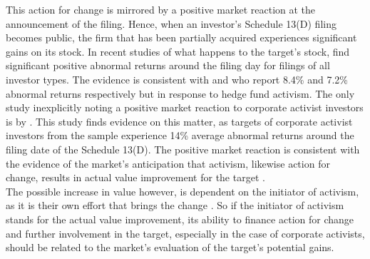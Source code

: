 \documentclass[12pt]{article}
\begin{document}
This action for change is mirrored by a positive market reaction at the announcement of the filing. Hence, when an investor's Schedule 13(D) filing becomes public, the firm that has been partially acquired experiences significant gains on its stock. In recent studies of what happens to the target's stock, \citet[p.1564]{Collin-Dufresne2015} find significant positive abnormal returns around the filing day for filings of all investor types. The evidence is consistent with \citet[p.1756]{Brav2008} and \citet[p.209]{Klein2009} who report 8.4\% and 7.2\% abnormal returns respectively but in response to hedge fund activism. The only study inexplicitly noting a positive market reaction to corporate activist investors is by \citet[p.29]{Brigida2012}. This study finds evidence on this matter, as targets of corporate activist investors from the sample experience 14\% average abnormal returns around the filing date of the Schedule 13(D). The positive market reaction is consistent with the evidence of the market's anticipation that activism, likewise action for change, results in actual value improvement for the target \citep[p.1760]{Brav2008}.\\
The possible increase in value however, is dependent on the initiator of activism, as it is their own effort that brings the change \citep[p.1563]{Collin-Dufresne2015}. So if the initiator of activism stands for the actual value improvement, its ability to finance action for change and further involvement in the target, especially in the case of corporate activists, should be related to the market's evaluation of the target's potential gains.
\end{document}
